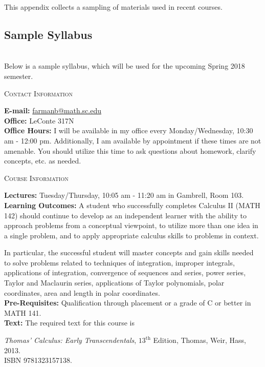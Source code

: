 \documentclass[teaching.portfolio.tex]{subfiles}
\begin{document}
This appendix collects a sampling of materials used in recent courses.

\subsection{Sample Syllabus}\hfill\\
Below is a sample syllabus, which will be used for the upcoming Spring 2018 semester.
\begin{center}
  \textsc{Contact Information}
\end{center}

\noindent
\textbf{E-mail:} \href{mailto:farmanb@math.sc.edu}{farmanb@math.sc.edu}\\
\noindent\textbf{Office:} LeConte 317N\\
\noindent\textbf{Office Hours:}
I will be available in my office every Monday/Wednesday, 10:30 am - 12:00 pm.
Additionally, I am available by appointment if these times are not amenable.
You should utilize this time to ask questions about homework, clarify concepts, etc. as needed.\\

\begin{center}
  \textsc{Course Information}
\end{center}

\noindent
\textbf{Lectures:}
Tuesday/Thursday,  10:05 am - 11:20 am in Gambrell, Room 103.\\

\noindent\textbf{Learning Outcomes:} A student who successfully completes Calculus II (MATH 142) should continue to develop as an independent learner 
with the ability to approach problems from a conceptual viewpoint, to utilize more than one idea in a single problem, and to apply appropriate 
calculus skills to problems in context.

In particular, the successful student will master concepts and gain skills needed to solve problems related to 
techniques of integration, 
improper integrals, 
applications of integration, 
convergence of sequences and series,
power series,
Taylor and Maclaurin series,
applications of Taylor polynomials,
polar coordinates,
area and length in polar coordinates.\\

\noindent\textbf{Pre-Requisites:} Qualification through placement or a grade of C or better in MATH 141.\\

\noindent\textbf{Text:}
The required text for this course is\\
\begin{center}
  {\it Thomas' Calculus: Early Transcendentals}, $13^{\text{th}}$ Edition, Thomas, Weir, Hass, 2013.  \\ISBN 9781323157138.
\end{center}
\end{document}
